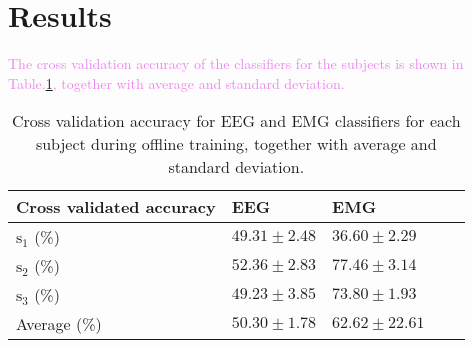\section{Results}

\textcolor{violet}{The cross validation accuracy of the classifiers for the subjects is shown in Table.\:\ref{tab:classifier_accuracy}, together with average and standard deviation.}
\begin{table}[ht]
	\centering
	\begin{tabular}{|l|l|l|l|l|}
			\hline
			Cross validated accuracy         & EEG                   & EMG                   \\
			\hline
			$\text{s}_1$ (\%)                & $49.31 \pm 2.48$      & $36.60 \pm 2.29$      \\
			$\text{s}_2$ (\%)                & $52.36 \pm 2.83$      & $77.46 \pm 3.14$      \\
			$\text{s}_3$ (\%)                & $49.23 \pm 3.85$      & $73.80 \pm 1.93$      \\
			Average (\%)                     & $50.30 \pm 1.78$      & $62.62 \pm 22.61$     \\
			\hline
		\end{tabular}
	\caption{Cross validation accuracy for EEG and EMG classifiers for each subject during offline training, together with average and standard deviation.}
	\label{tab:classifier_accuracy}
\end{table}

